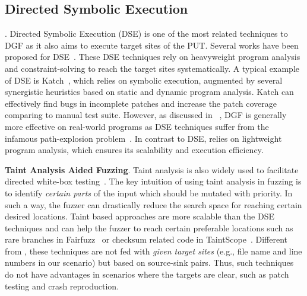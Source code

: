 \subsection{Directed Symbolic Execution}.
Directed Symbolic Execution (DSE) is one of the most related techniques to DGF as it also aims to execute target sites of the PUT.
Several works have been proposed for DSE~\cite{Godefroid:2005:DART, Ma:2011:DSE:2041552.2041563, Haller:2013:DOG, Jin:2012, Marinescu:2013:katch}.
These DSE techniques rely on heavyweight program analysis and  constraint-solving to reach the target sites systematically.
A typical example of DSE is Katch~\cite{Marinescu:2013:katch}, which relies on symbolic execution, augmented by several synergistic heuristics based on static and dynamic program analysis.
Katch can effectively find bugs in incomplete patches and increase the patch coverage comparing to manual test suite.
However, as discussed in ~\cite{Bohme:2017:DGF}, DGF is generally more effective on real-world programs as DSE techniques suffer from the infamous path-explosion problem~\cite{Stephens2016Driller}.
In contrast to DSE, \dFOT relies on  lightweight program analysis, which ensures its scalability and execution efficiency.

\noindent\textbf{Taint Analysis Aided Fuzzing}.
Taint analysis is also widely used to facilitate directed white-box testing~\cite{Ganesh:2009:TDW, rawat:2017, wangwgz:2010, Angora,FairFuzz}.
The key intuition of using taint analysis in fuzzing is to identify \emph{certain parts} of the input which should be mutated with priority.
In such a way, the fuzzer can drastically reduce the search space for reaching certain desired locations.
Taint based approaches are more scalable than the DSE techniques and can help the fuzzer to reach certain preferable locations such as rare branches in Fairfuzz~\cite{FairFuzz} or checksum related code in TaintScope~\cite{wangwgz:2010}.
Different from \dFOT, these techniques are not fed with \emph{given target sites} (e.g., file name and line numbers in our scenario) but based on source-sink pairs.
Thus, such techniques do not have advantages in scenarios where the targets are clear, such as patch testing and crash reproduction. 


